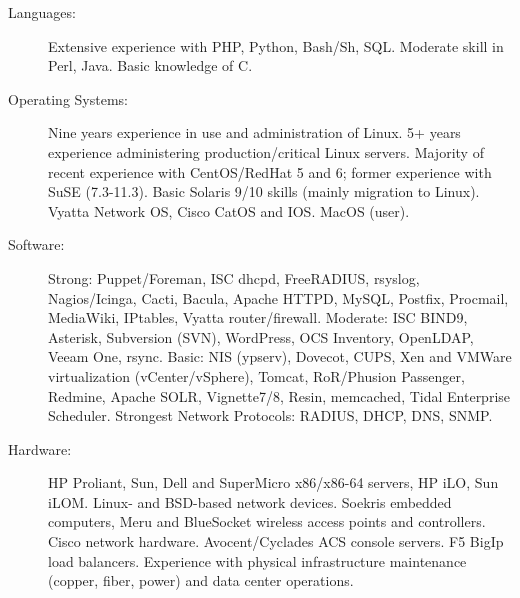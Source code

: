 \documentclass[letterpaper,11pt]{article}
\newcommand{\resheading}[1]{{\large \colorbox{mygrey}{\begin{minipage}{\textwidth}{\textbf{#1 \vphantom{p\^{E}}}}\end{minipage}}}}
\begin{document}
\begin{description}
\item[Languages:]
Extensive experience with PHP, Python, Bash/Sh, SQL. Moderate skill in Perl, Java. Basic knowledge of C.
\item[Operating Systems:]
Nine years experience in use and administration of Linux. 5+ years experience administering production/critical Linux servers.
Majority of recent experience with CentOS/RedHat 5 and 6; former experience with SuSE
(7.3-11.3). Basic Solaris 9/10 skills (mainly migration to Linux). Vyatta Network OS, Cisco CatOS and IOS. MacOS (user).
\item[Software:]
Strong: Puppet/Foreman, ISC dhcpd, FreeRADIUS, rsyslog, Nagios/Icinga, Cacti, Bacula, Apache HTTPD, MySQL, Postfix, Procmail, MediaWiki, IPtables, Vyatta router/firewall. Moderate: ISC BIND9, Asterisk, Subversion (SVN), WordPress, OCS Inventory, OpenLDAP, Veeam One, rsync. Basic: NIS (ypserv), Dovecot, CUPS, Xen and VMWare virtualization (vCenter/vSphere), Tomcat, RoR/Phusion Passenger, Redmine, Apache SOLR, Vignette7/8, Resin, memcached, Tidal Enterprise Scheduler. Strongest Network Protocols: RADIUS, DHCP, DNS, SNMP.


\item[Hardware:]
HP Proliant, Sun, Dell and SuperMicro x86/x86-64 servers, HP iLO, Sun iLOM. Linux- and
BSD-based network devices. Soekris embedded computers, Meru and BlueSocket
wireless access points and controllers. Cisco network hardware. Avocent/Cyclades ACS console servers. F5 BigIp load balancers. Experience with physical infrastructure maintenance (copper, fiber, power) and data center operations.
\end{description}

\end{document}
